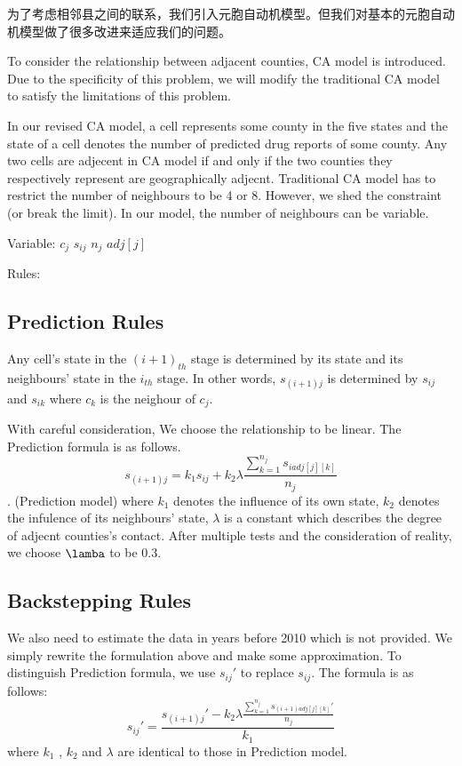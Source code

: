 为了考虑相邻县之间的联系，我们引入元胞自动机模型。但我们对基本的元胞自动机模型做了很多改进来适应我们的问题。

	To consider the relationship between adjacent 
counties, CA model is introduced. Due to the specificity of this problem, we will modify the traditional CA model to satisfy the limitations of this problem. \par

	In our revised CA model, a cell represents some county in the five states and the state of a cell denotes the number of predicted drug reports of some county. Any two cells are adjecent in CA model if and only if the two counties they respectively represent are geographically adjecnt. Traditional CA model has to restrict the number of neighbours to be 4 or 8. However, we shed the constraint (or break the limit). In our model, the number of neighbours can be variable. \par

	Variable:
		$c_{j}$
		$s_{ij}$
		$n_{j}$
		$adj[j]$


	Rules:\\
	\subsection{Prediction Rules }
		Any cell's state in the $(i+1)_{th}$ stage is determined by its state and its neighbours' state in the $i_{th}$ stage. In other words, $s_{(i+1)j}$ is determined by $s_{ij}$ and $s_{ik}$ where $c_k$ is the neighour of $c_j$.\par
		With careful consideration, We choose the relationship to be linear. The Prediction formula is as follows.
			$$ s_{(i+1)j} = k_1 s_{ij} + k_2 \lambda \frac{\sum _{k=1} ^{n_j} s_{i adj[j][k]} }{n_j} $$. (Prediction model)
		where $k_1$ denotes the influence of its own state, $k_2$ denotes the infulence of its neighbours' state, $\lambda$ is a constant which describes the degree of adjecnt counties's contact. After multiple tests and the consideration of reality, we choose $\lamba$ to be 0.3.\par
	\subsection{Backstepping Rules}
		We also need to estimate the data in years before 2010 which is not provided. We simply rewrite the formulation above and make some approximation. To distinguish Prediction formula, we use $s_{ij}'$ to replace $s_{ij}$. The formula is as follows:
			$$ s_{ij}' = \frac{s_{(i+1)j}' - k_2 \lambda \frac{\sum _{k=1} ^{n_j} s_{(i+1) adj[j][k]}' }{n_j} }{k_1} $$
			where $k_1$ , $k_2$ and $\lambda$ are identical to those in Prediction model. 

